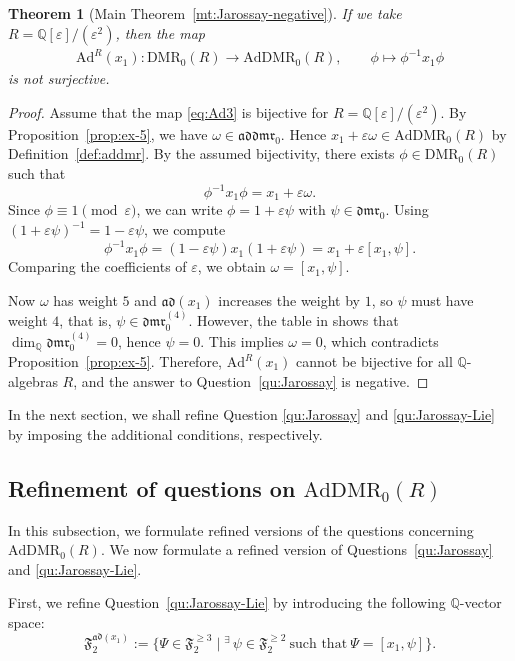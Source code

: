 \documentclass[15pt,oneside,reqno]{amsart}
\newtheorem{thm}[df]{Theorem}
\theoremstyle{remark}{
\newtheorem{lem}[df]{Lemma}
\newtheorem{prop}[df]{Proposition}
\newtheorem{ex}[df]{Example}
\newtheorem{rmk}[df]{Remark}
}
\newcommand{\ide}[1]{\mathfrak{#1}}
\newcommand{\Q}{\mathbb{Q}}
\newcommand{\DMR}{\mathrm{DMR}}
\newcommand{\dmr}{\mathfrak{dmr}}
\newcommand{\AdDMR}{\mathrm{AdDMR}}
\newcommand{\addmr}{\mathfrak{addmr}}
\newcommand{\Ad}{\mathrm{Ad}}
\newcommand{\ad}{\mathfrak{ad}}
\newcommand{\Fad}{\mathfrak{F}_2^{\ad(x_1)}}
\begin{document}
\begin{thm}[{Main Theorem~\ref{mt:Jarossay-negative}}]\label{thm:Jarossay-negative}
If we take $R=\Q[\varepsilon]/(\varepsilon^2)$, then the map
\begin{align}
\Ad^R(x_1)\colon \DMR_0(R)\longrightarrow \AdDMR_0(R),\qquad
\phi \longmapsto \phi^{-1}x_1\phi \label{eq:Ad3}
\end{align}
is not surjective.
\end{thm}

\begin{proof}
Assume that the map \eqref{eq:Ad3}
is bijective for $R=\Q[\varepsilon]/(\varepsilon^2)$.
By Proposition~\ref{prop:ex-5}, we have $\omega\in \addmr_0$.
Hence $x_1+\varepsilon \omega\in \AdDMR_0(R)$ by Definition~\ref{def:addmr}.
By the assumed bijectivity, there exists $\phi\in \DMR_0(R)$ such that
\[
\phi^{-1} x_1 \phi=x_1+\varepsilon \omega.
\]
Since $\phi\equiv 1\pmod{\varepsilon}$, we can write $\phi=1+\varepsilon\psi$ with $\psi\in \dmr_0$.
Using $(1+\varepsilon\psi)^{-1}=1-\varepsilon\psi$, we compute
\[
\phi^{-1} x_1 \phi=(1-\varepsilon\psi)x_1(1+\varepsilon\psi)
= x_1+\varepsilon[x_1,\psi].
\]
Comparing the coefficients of $\varepsilon$, we obtain $\omega=[x_1,\psi]$.

Now $\omega$ has weight $5$ and $\ad(x_1)$ increases the weight by $1$, so $\psi$ must have weight $4$, that is, $\psi\in \dmr_0^{(4)}$.
However, the table in \cite[pp.5]{Schneps-ds} shows that $\dim_{\Q}\dmr_0^{(4)}=0$, hence $\psi=0$.
This implies $\omega=0$, which contradicts Proposition~\ref{prop:ex-5}.
Therefore, $\Ad^{R}(x_1)$ cannot be bijective for all $\Q$-algebras $R$, and the answer to Question~\ref{qu:Jarossay} is negative.
\end{proof}

In the next section, we shall refine  Question \ref{qu:Jarossay} and \ref{qu:Jarossay-Lie} by imposing the additional conditions, respectively.

\subsection{Refinement of questions on $\AdDMR_0(R)$}

In this subsection, we formulate refined versions of the questions concerning $\AdDMR_0(R)$.
We now formulate a refined version of Questions~\ref{qu:Jarossay} and \ref{qu:Jarossay-Lie}.

First, we refine Question~\ref{qu:Jarossay-Lie} by introducing the following $\Q$-vector space:
\[
\Fad := \{\Psi \in \ide{F}_2^{\ge 3} \mid {}^\exists\, \psi \in \ide{F}_2^{\ge 2}\ \text{such that}\ \Psi = [x_1,\psi]\}.
\]
\end{document}
